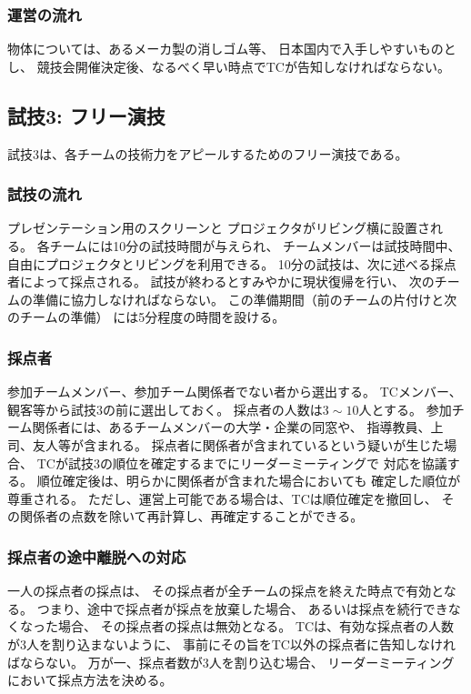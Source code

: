 \documentclass[a4j]{jarticle}
\begin{document}
\subsubsection{運営の流れ}

物体については、あるメーカ製の消しゴム等、
日本国内で入手しやすいものとし、
競技会開催決定後、なるべく早い時点でTCが告知しなければならない。

\subsection{試技3: フリー演技}

試技3は、各チームの技術力をアピールするためのフリー演技である。

\subsubsection{試技の流れ}

プレゼンテーション用のスクリーンと
プロジェクタがリビング横に設置される。
各チームには10分の試技時間が与えられ、
チームメンバーは試技時間中、
自由にプロジェクタとリビングを利用できる。
10分の試技は、次に述べる採点者によって採点される。
試技が終わるとすみやかに現状復帰を行い、
次のチームの準備に協力しなければならない。
この準備期間（前のチームの片付けと次のチームの準備）
には5分程度の時間を設ける。

\subsubsection{採点者}

参加チームメンバー、参加チーム関係者でない者から選出する。
TCメンバー、観客等から試技3の前に選出しておく。
採点者の人数は$3\sim10$人とする。
参加チーム関係者には、あるチームメンバーの大学・企業の同窓や、
指導教員、上司、友人等が含まれる。
採点者に関係者が含まれているという疑いが生じた場合、
TCが試技3の順位を確定するまでにリーダーミーティングで
対応を協議する。
順位確定後は、明らかに関係者が含まれた場合においても
確定した順位が尊重される。
ただし、運営上可能である場合は、TCは順位確定を撤回し、
その関係者の点数を除いて再計算し、再確定することができる。

\subsubsection{採点者の途中離脱への対応}

一人の採点者の採点は、
その採点者が全チームの採点を終えた時点で有効となる。
つまり、途中で採点者が採点を放棄した場合、
あるいは採点を続行できなくなった場合、
その採点者の採点は無効となる。
TCは、有効な採点者の人数が$3$人を割り込まないように、
事前にその旨をTC以外の採点者に告知しなければならない。
万が一、採点者数が$3$人を割り込む場合、
リーダーミーティングにおいて採点方法を決める。
\end{document}
